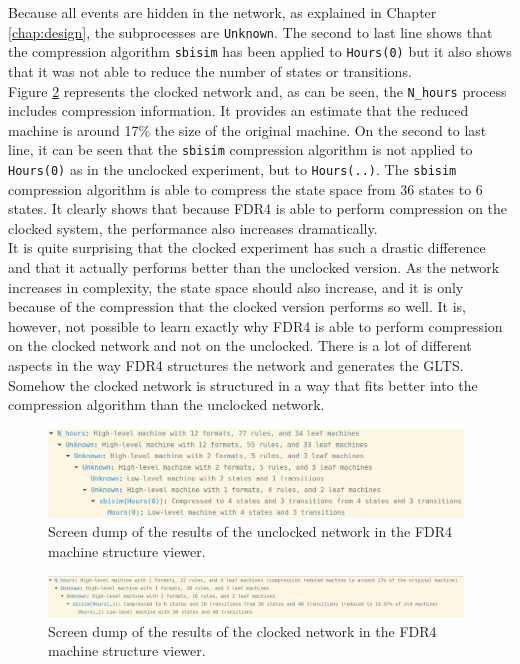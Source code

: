 Because all events are hidden in the network, as explained in Chapter \ref{chap:design}, the subprocesses are \texttt{Unknown}. The second to last line shows that the compression algorithm \texttt{sbisim} has been applied to \texttt{Hours(0)} but it also shows that it was not able to reduce the number of states or transitions. \\

Figure \ref{fig:clocked_compression} represents the clocked network and, as can be seen, the \texttt{N\_hours} process includes compression information. It provides an estimate that the reduced machine is around 17\% the size of the original machine. On the second to last line, it can be seen that the \texttt{sbisim} compression algorithm is not applied to \texttt{Hours(0)} as in the unclocked experiment, but to \texttt{Hours(..)}. The \texttt{sbisim} compression algorithm is able to compress the state space from 36 states to 6 states. It clearly shows that because FDR4 is able to perform compression on the clocked system, the performance also increases dramatically.\\

It is quite surprising that the clocked experiment has such a drastic difference and that it actually performs better than the unclocked version. As the network increases in complexity, the state space should also increase, and it is only because of the compression that the clocked version performs so well. It is, however, not possible to learn exactly why FDR4 is able to perform compression on the clocked network and not on the unclocked. There is a lot of different aspects in the way FDR4 structures the network and generates the GLTS. Somehow the clocked network is structured in a way that fits better into the compression algorithm than the unclocked network.
\begin{figure}
    \includegraphics[width=0.98\textwidth]{./figures/unclocked_compression.jpg}
\caption{Screen dump of the results of the unclocked network in the FDR4 machine structure viewer.}
\label{fig:unclocked_compression}
\end{figure}
\begin{figure}
    \includegraphics[width=0.98\textwidth]{./figures/clocked_compression.jpg}
\caption{Screen dump of the results of the clocked network in the FDR4 machine structure viewer.}
\label{fig:clocked_compression}
\end{figure}

